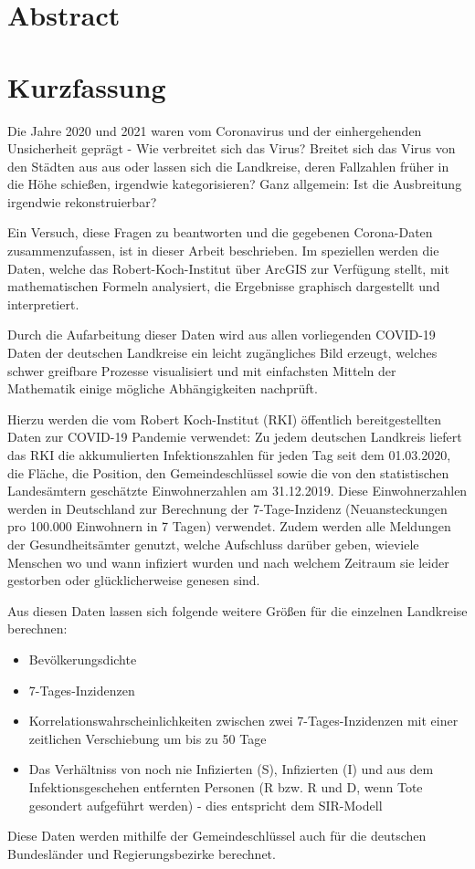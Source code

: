 \chapter*{Abstract}
\chapter*{Kurzfassung}
Die Jahre 2020 und 2021 waren vom Coronavirus und der einhergehenden Unsicherheit geprägt - Wie verbreitet sich das Virus? Breitet sich das Virus von den Städten aus aus oder lassen sich die Landkreise, deren Fallzahlen früher in die Höhe schießen, irgendwie kategorisieren? Ganz allgemein: Ist die Ausbreitung irgendwie rekonstruierbar?

Ein Versuch, diese Fragen zu beantworten und die gegebenen Corona-Daten zusammenzufassen, ist in dieser Arbeit beschrieben. Im speziellen werden die Daten, welche das Robert-Koch-Institut über ArcGIS zur Verfügung stellt, mit mathematischen Formeln analysiert, die Ergebnisse graphisch dargestellt und interpretiert.

Durch die Aufarbeitung dieser Daten wird aus allen vorliegenden COVID-19 Daten der deutschen Landkreise ein leicht zugängliches Bild erzeugt, welches schwer greifbare Prozesse visualisiert und mit einfachsten Mitteln der Mathematik einige mögliche Abhängigkeiten nachprüft.

Hierzu werden die vom Robert Koch-Institut (RKI) öffentlich bereitgestellten Daten zur COVID-19 Pandemie verwendet: Zu jedem deutschen Landkreis liefert das RKI die akkumulierten Infektionszahlen für jeden Tag seit dem 01.03.2020, die Fläche, die Position, den Gemeindeschlüssel sowie die von den statistischen Landesämtern geschätzte Einwohnerzahlen am 31.12.2019. Diese Einwohnerzahlen werden in Deutschland zur Berechnung der 7-Tage-Inzidenz (Neuansteckungen pro 100.000 Einwohnern in 7 Tagen) verwendet. 
Zudem werden alle Meldungen der Gesundheitsämter genutzt, welche Aufschluss darüber geben, wieviele Menschen wo und wann infiziert wurden und nach welchem Zeitraum sie leider gestorben oder glücklicherweise genesen sind.


Aus diesen Daten lassen sich folgende weitere Größen für die einzelnen Landkreise berechnen:
\begin{itemize}
    \item Bevölkerungsdichte
    \item 7-Tages-Inzidenzen
    \item Korrelationswahrscheinlichkeiten zwischen zwei 7-Tages-Inzidenzen mit einer zeitlichen Verschiebung um bis zu 50 Tage
    \item Das Verhältniss von noch nie Infizierten (S), Infizierten (I) und aus dem Infektionsgeschehen entfernten Personen (R bzw. R und D, wenn Tote gesondert aufgeführt werden) - dies entspricht dem SIR-Modell
\end{itemize}

Diese Daten werden mithilfe der Gemeindeschlüssel auch für die deutschen Bundesländer und Regierungsbezirke berechnet.

\newpage